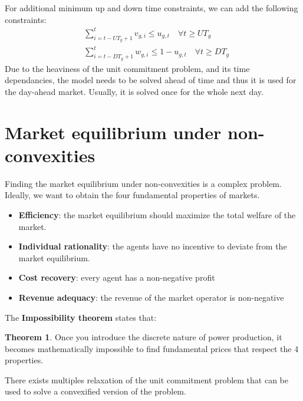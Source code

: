 \documentclass[12pt, openany]{report}
\theoremstyle{definition}
\newtheorem{thm}{Theorem}[chapter]
\begin{document}
For additional minimum up and down time constraints, we can add the following constraints:
\begin{equation}
    \begin{aligned}
        & \sum_{i = t-UT_g+1}^{t} v_{g,i} \leq u_{g,t} \quad \forall t \geq UT_g \\
        & \sum_{i = t-DT_g+1}^{t} w_{g,i} \leq 1 - u_{g,t} \quad \forall t \geq DT_g
    \end{aligned}
\end{equation}
Due to the heaviness of the unit commitment problem, and its time dependancies, the model needs to be solved ahead of time and thus it is used for the day-ahead market. Usually, it is solved once for the whole next day.
\section{Market equilibrium under non-convexities}
Finding the market equilibrium under non-convexities is a complex problem. Ideally, we want to obtain the four fundamental properties of markets.
\begin{itemize}
    \item \textbf{Efficiency}: the market equilibrium should maximize the total welfare of the market.
    \item \textbf{Individual rationality}: the agents have no incentive to deviate from the market equilibrium.
    \item \textbf{Cost recovery}: every agent has a non-negative profit
    \item \textbf{Revenue adequacy}: the revenue of the market operator is non-negative
\end{itemize} 
The \textbf{Impossibility theorem} states that:
\begin{thm}
    Once you introduce the discrete nature of power production, it becomes mathematically impossible to find fundamental prices that respect the 4 properties.
\end{thm}
There exists multiples relaxation of the unit commitment problem that can be used to solve a convexified version of the problem.
\end{document}
